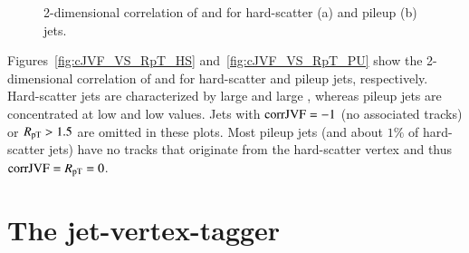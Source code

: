 \documentclass{atlasnote}
\begin{document}




\begin{figure}[!htbp]
  \centering
  \caption{2-dimensional correlation of \cJVF and \RpT for hard-scatter (a) and pileup (b) jets.}
\label{fig:cJVF_vs_RpT}
\end{figure}
Figures~\ref{fig:cJVF_VS_RpT_HS} and~\ref{fig:cJVF_VS_RpT_PU} show the 2-dimensional correlation of 
\RpT and \cJVF for hard-scatter and pileup jets, respectively. Hard-scatter jets are characterized by large \cJVF and 
large \RpT, whereas pileup jets are concentrated at low \RpT and low \cJVF values. 
Jets with ${\rm corrJVF}=-1$ (\ie no associated tracks) or $R_\mathrm{pT} >1.5$ are omitted in these plots. 
Most pileup jets (and about $1\%$ of hard-scatter jets) have no tracks that originate from the hard-scatter vertex and thus ${\rm corrJVF}=R_\mathrm{pT}=0$.




\section{The jet-vertex-tagger}
\label{sec:JVT}
\end{document}
